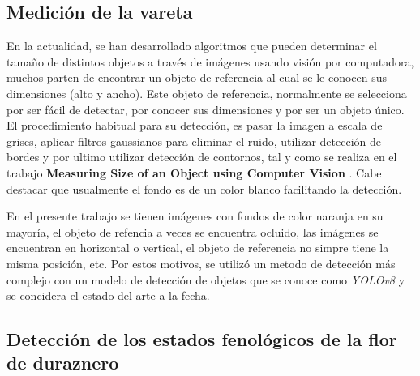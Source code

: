 \subsection{Medición de la vareta}

En la actualidad, se han desarrollado algoritmos que pueden determinar el tamaño de distintos objetos a través de imágenes usando visión por computadora, muchos parten de encontrar un objeto de referencia al cual se le conocen sus dimensiones (alto y ancho). Este objeto de referencia, normalmente se selecciona por ser fácil de detectar, por conocer sus dimensiones y por ser un objeto único. El procedimiento habitual para su detección, es pasar la imagen a escala de grises, aplicar filtros gaussianos para eliminar el ruido, utilizar detección de bordes y por ultimo utilizar detección de contornos, tal y como se realiza en el trabajo \textbf{Measuring Size of an Object using Computer Vision} \cite{ARTICLE:2}. Cabe destacar que usualmente el fondo es de un color blanco facilitando la detección.

En el presente trabajo se tienen imágenes con fondos de color naranja en su mayoría, el objeto de refencia a veces se encuentra ocluido, las imágenes se encuentran en horizontal o vertical, el objeto de referencia no simpre tiene la misma posición, etc. Por estos motivos, se utilizó un metodo de detección más complejo con un modelo de detección de objetos que se conoce como \textit{YOLOv8} y se concidera el estado del arte a la fecha.

\subsection{Detección de los estados fenológicos de la flor de duraznero}







